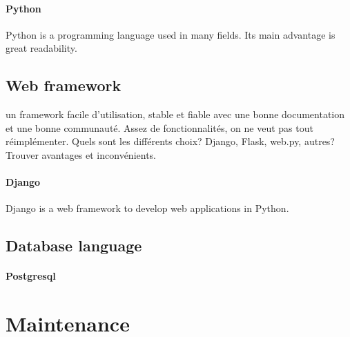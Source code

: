 \paragraph{Python}
Python is a programming language used in many fields. Its main advantage is great readability.


\subsection{Web framework}
un framework facile d'utilisation, stable et fiable avec une bonne documentation et une bonne communauté. Assez de fonctionnalités, on ne veut pas tout réimplémenter.
Quels sont les différents choix? Django, Flask, web.py, autres? Trouver avantages et inconvénients.

\paragraph{Django}
Django is a web framework to develop web applications in Python. 

\subsection{Database language}

\paragraph{Postgresql}


\section{Maintenance}



